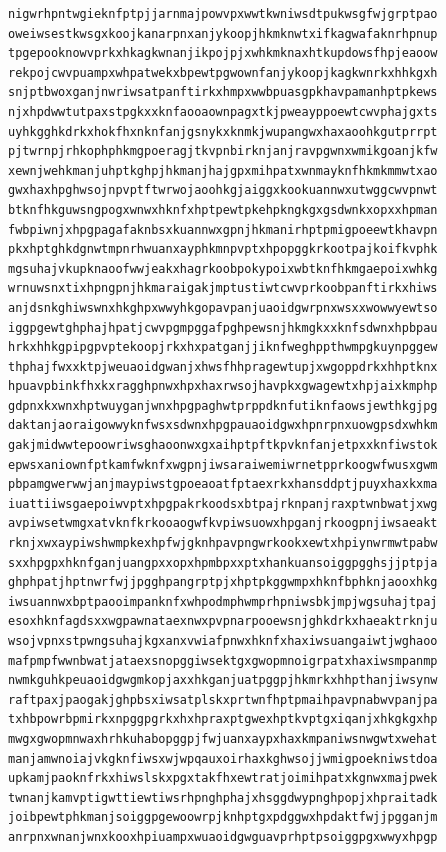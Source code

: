 \documentclass[11pt,letterpaper]{exam}
\begin{document}
\begin{questions}
\begin{verbatim}
nigwrhpntwgieknfptpjjarnmajpowvpxwwtkwniwsdtpukwsgfwjgrptpao
oweiwsestkwsgxkoojkanarpnxanjykoopjhkmknwtxifkagwafaknrhpnup
tpgepooknowvprkxhkagkwnanjikpojpjxwhkmknaxhtkupdowsfhpjeaoow
rekpojcwvpuampxwhpatwekxbpewtpgwownfanjykoopjkagkwnrkxhhkgxh
snjptbwoxganjnwriwsatpanftirkxhmpxwwbpuasgpkhavpamanhptpkews
njxhpdwwtutpaxstpgkxxknfaooaownpagxtkjpweayppoewtcwvphajgxts
uyhkgghkdrkxhokfhxnknfanjgsnykxknmkjwupangwxhaxaoohkgutprrpt
pjtwrnpjrhkophphkmgpoeragjtkvpnbirknjanjravpgwnxwmikgoanjkfw
xewnjwehkmanjuhptkghpjhkmanjhajgpxmihpatxwnmayknfhkmkmmwtxao
gwxhaxhpghwsojnpvptftwrwojaoohkgjaiggxkookuannwxutwggcwvpnwt
btknfhkguwsngpogxwnwxhknfxhptpewtpkehpkngkgxgsdwnkxopxxhpman
fwbpiwnjxhpgpagafaknbsxkuannwxgpnjhkmanirhptpmigpoeewtkhavpn
pkxhptghkdgnwtmpnrhwuanxayphkmnpvptxhpopggkrkootpajkoifkvphk
mgsuhajvkupknaoofwwjeakxhagrkoobpokypoixwbtknfhkmgaepoixwhkg
wrnuwsnxtixhpngpnjhkmaraigakjmptustiwtcwvprkoobpanftirkxhiws
anjdsnkghiwswnxhkghpxwwyhkgopavpanjuaoidgwrpnxwsxxwowwyewtso
iggpgewtghphajhpatjcwvpgmpggafpghpewsnjhkmgkxxknfsdwnxhpbpau
hrkxhhkgpipgpvptekoopjrkxhxpatganjjiknfweghppthwmpgkuynpggew
thphajfwxxktpjweuaoidgwanjxhwsfhhpragewtupjxwgoppdrkxhhptknx
hpuavpbinkfhxkxragghpnwxhpxhaxrwsojhavpkxgwagewtxhpjaixkmphp
gdpnxkxwnxhptwuyganjwnxhpgpaghwtprppdknfutiknfaowsjewthkgjpg
daktanjaoraigowwyknfwsxsdwnxhpgpauaoidgwxhpnrpnxuowgpsdxwhkm
gakjmidwwtepoowriwsghaoonwxgxaihptpftkpvknfanjetpxxknfiwstok
epwsxaniownfptkamfwknfxwgpnjiwsaraiwemiwrnetpprkoogwfwusxgwm
pbpamgwerwwjanjmaypiwstgpoeaoatfptaexrkxhansddptjpuyxhaxkxma
iuattiiwsgaepoiwvptxhpgpakrkoodsxbtpajrknpanjraxptwnbwatjxwg
avpiwsetwmgxatvknfkrkooaogwfkvpiwsuowxhpganjrkoogpnjiwsaeakt
rknjxwxaypiwshwmpkexhpfwjgknhpavpngwrkookxewtxhpiynwrmwtpabw
sxxhpgpxhknfganjuangpxxopxhpmbpxxptxhankuansoiggpgghsjjptpja
ghphpatjhptnwrfwjjpgghpangrptpjxhptpkggwmpxhknfbphknjaooxhkg
iwsuannwxbptpaooimpanknfxwhpodmphwmprhpniwsbkjmpjwgsuhajtpaj
esoxhknfagdsxxwgpawnataexnwxpvpnarpooewsnjghkdrkxhaeaktrknju
wsojvpnxstpwngsuhajkgxanxvwiafpnwxhknfxhaxiwsuangaiwtjwghaoo
mafpmpfwwnbwatjataexsnopggiwsektgxgwopmnoigrpatxhaxiwsmpanmp
nwmkguhkpeuaoidgwgmkopjaxxhkganjuatpggpjhkmrkxhhpthanjiwsynw
raftpaxjpaogakjghpbsxiwsatplskxprtwnfhptpmaihpavpnabwvpanjpa
txhbpowrbpmirkxnpggpgrkxhxhpraxptgwexhptkvptgxiqanjxhkgkgxhp
mwgxgwopmnwaxhrhkuhabopggpjfwjuanxaypxhaxkmpaniwsnwgwtxwehat
manjamwnoiajvkgknfiwsxwjwpqauxoirhaxkghwsojjwmigpoekniwstdoa
upkamjpaoknfrkxhiwslskxpgxtakfhxewtratjoimihpatxkgnwxmajpwek
twnanjkamvptigwttiewtiwsrhpnghphajxhsggdwypnghpopjxhpraitadk
joibpewtphkmanjsoiggpgewoowrpjknhptgxpdggwxhpdaktfwjjpgganjm
anrpnxwnanjwnxkooxhpiuampxwuaoidgwguavprhptpsoiggpgxwwyxhpgp

\end{verbatim}
\end{questions}
\end{document}
